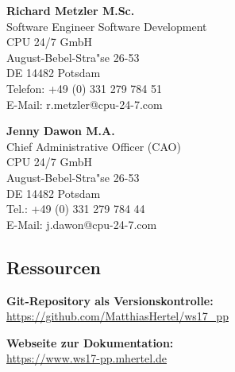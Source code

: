 \documentclass[12pt]{article}
\begin{document}
\textbf{Richard Metzler M.Sc.}\\
Software Engineer Software Development\\

CPU 24/7 GmbH \\
August-Bebel-Stra"se 26-53\\
DE 14482 Potsdam\\

Telefon: +49 (0) 331 279 784 51 \\
E-Mail: r.metzler@cpu-24-7.com

\bigbreak
\bigbreak
\textbf{Jenny Dawon M.A.}\\
Chief Administrative Officer (CAO)\\

CPU 24/7 GmbH\\
August-Bebel-Stra"se 26-53\\
DE 14482 Potsdam\\

Tel.: +49 (0) 331 279 784 44\\
E-Mail: j.dawon@cpu-24-7.com

\subsection{Ressourcen}
\textbf{Git-Repository als Versionskontrolle:}\\
\url{https://github.com/MatthiasHertel/ws17_pp}

\textbf{Webseite zur Dokumentation:}\\
\url{https://www.ws17-pp.mhertel.de}



\clearpage
\setlength\bibitemsep{10pt}
\renewcommand*{\bibfont}{\footnotesize}

\printbibliography[type=tech,heading=bibintoc, title=Verwendete Technologien]
\renewcommand*{\bibfont}{\footnotesize}
\printbibliography[type=package,heading=bibintoc, title=Verwendete Go-Packages]
\newpage
{}
{}
\listoffigures
\newpage

%



\end{document}
